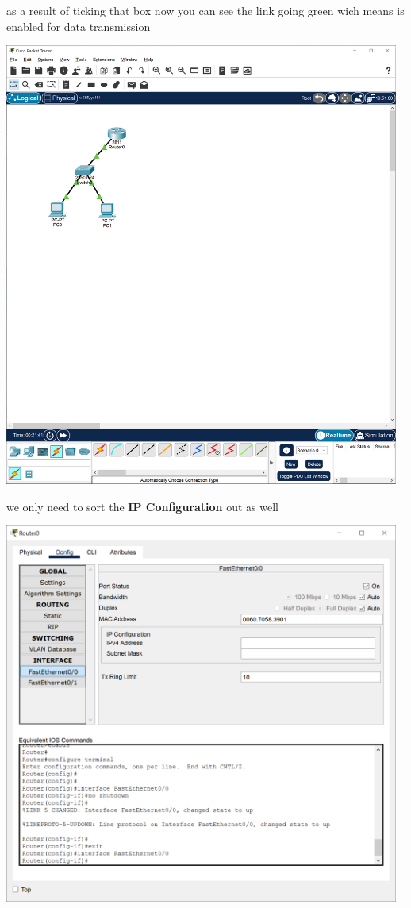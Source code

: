 \documentclass[a4paper,12pt]{book}
\begin{document}
\noindent as a result of ticking that box now you can see the link going green wich means is enabled for data transmission \newline

\noindent \includegraphics[width=13cm]{./step-by-step/15.PNG}
\clearpage


\noindent we only need to sort the \textbf{IP Configuration} out as well \newline

\noindent \includegraphics[width=13cm]{./step-by-step/16.PNG}
\clearpage
\end{document}
